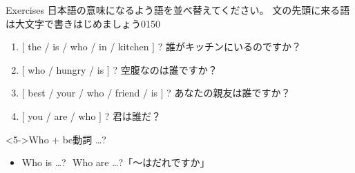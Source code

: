 \documentclass[aspectratio=169,xcolor={dvipsnames,table}]{beamer}
\begin{document}
\begin{frame}[plain]{Exercises}
日本語の意味になるよう語を並べ替えてください。
文の先頭に来る語は大文字で書きはじめましょう\mbox{}\hfill{\tiny 0150}\,{\scriptsize {}}

 \begin{enumerate}
  \item  $[$ the / is / who / in / kitchen $]$ ? 誰がキッチンにいるのですか？\\
  \item  $[$ who / hungry / is $]$ ? 空腹なのは誰ですか？\\
  \item  $[$ best / your / who / friend / is $]$ ? あなたの親友は誰ですか？\\
  \item  $[$ you / are / who $]$ ? 君は誰だ？\\
\end{enumerate}

\begin{block}<5->{Who $+$ be動詞 \ldots ?}
 \begin{itemize}[square]
  \item Who is \ldots{}?\,\, Who are \ldots{}?\hfill{}「～はだれですか」
 \end{itemize}
\end{block}
\end{frame}
\end{document}
